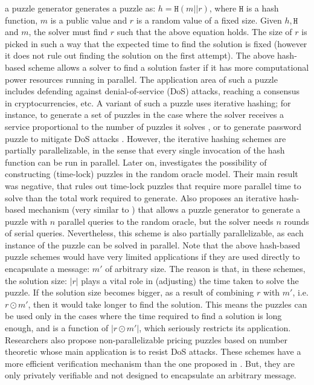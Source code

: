 a puzzle generator  generates a puzzle as: $h= \mathtt{H}(m||r)$, where $\mathtt{H}$ is a hash function, $m$ is a public value and $r$ is a random value of a fixed size. Given $h, \mathtt{H}$ and $m$, the solver must find $r$ such that the above equation holds. The size of $r$ is picked in such a way that the expected time to find the solution is fixed (however it does not rule out finding the solution on the first attempt). The above hash-based scheme allows a solver to find a solution faster if it has more computational power resources  running in parallel. The application area of such a puzzle includes  defending against denial-of-service (DoS)  attacks, reaching a consensus in cryptocurrencies, etc. A  variant  of such a puzzle uses iterative hashing; for instance, to generate a set of puzzles  in the case where the solver receives a service proportional to the number of puzzles it solves \cite{groza2006chained},  or to generate password puzzle to mitigate DoS attacks \cite{Ma05}. However, the iterative hashing schemes are partially parallelizable, in the sense that every single invocation of the hash function can be run in parallel. Later on,  \cite{MahmoodyMV11} investigates the possibility of constructing (time-lock) puzzles in the random oracle model.  Their main result was negative, that rules out time-lock puzzles that require more parallel time to solve than the total work required to generate.  Also \cite{MahmoodyMV11} proposes an iterative hash-based mechanism (very similar to \cite{Ma05}) that allows a puzzle generator to generate a puzzle with $n$ parallel queries to the random oracle, but the solver needs $n$ rounds of serial queries. Nevertheless, this scheme is also partially parallelizable, as each instance of the puzzle can be solved in parallel. Note that the above hash-based puzzle schemes would have very limited applications if they are used directly to  encapsulate a message: $m'$ of arbitrary size. The reason is that, in these schemes,  the solution  size: $|r|$ plays a vital role in (adjusting) the  time taken to solve the puzzle. If the solution size becomes bigger, as a result of combining $r$ with $m'$, i.e. $r \odot m'$, then it would take longer to find the solution. This means  the puzzles can be used only in the cases where  the time required to find a solution is long enough, and is a function of $|r \odot m'|$, which seriously restricts its application. Researchers also propose non-parallelizable pricing puzzles based on number theoretic \cite{WatersJHF04,KuppusamyRSBN12,KarameC10} whose main application is to resist DoS attacks. These schemes  have a more efficient verification mechanism than the one proposed in \cite{Rivest:1996:TPT:888615}. But, they are only privately verifiable and not designed to encapsulate an arbitrary message. 





